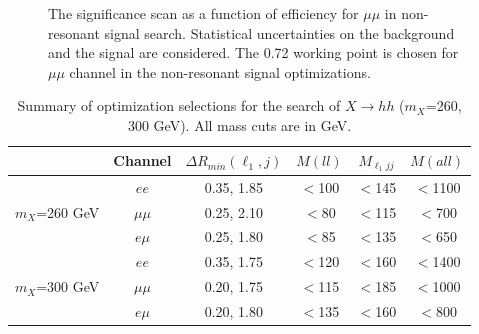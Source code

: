 \begin{figure}[h]
\begin{center}
\caption{The significance scan as a function of efficiency for $\mu\mu$ in non-resonant signal search. Statistical uncertainties on the background and the signal are considered. The 0.72 working point is chosen for $\mu\mu$ channel in the non-resonant signal optimizations.}
\label{fig:nonres:SigOpt_mumu}
\end{center}
\end{figure}

\begin{table}[h]
\begin{center}
\begin{tabular}{c|c|c|c|c|c}
\hline
\hline
  &Channel &$\Delta R_{min}(\ell_{1}, j)$ &$M(ll)$  &$M_{\ell_{1}jj}$ &$M(all)$\\
\hline
\multirow{3}{2.0cm}{$m_X$=260 GeV} &$ee$  &0.35, 1.85
&$<$100
&$<$145
&$<$1100  \\
&$\mu\mu$
&0.25, 2.10
&$<$80
&$<$115
&$<$700 \\
&$e\mu$
&0.25, 1.80
&$<$85
&$<$135
&$<$650\\
\hline
\multirow{3}{2.0cm}{$m_X$=300 GeV} &$ee$
&0.35, 1.75
&$<$120
&$<$160
&$<$1400 \\
&$\mu\mu$
&0.20, 1.75
&$<$115
&$<$185
&$<$1000 \\
&$e\mu$
&0.20, 1.80
&$<$135
&$<$160
&$<$800 \\
\hline
\hline
\end{tabular}
\end{center}
\caption{Summary of optimization selections for the search of $X \rightarrow hh$ ($m_{X}$=260, 300 GeV). All mass cuts are in GeV.}
\label{optimization_cuts_lowmass}
\end{table}

